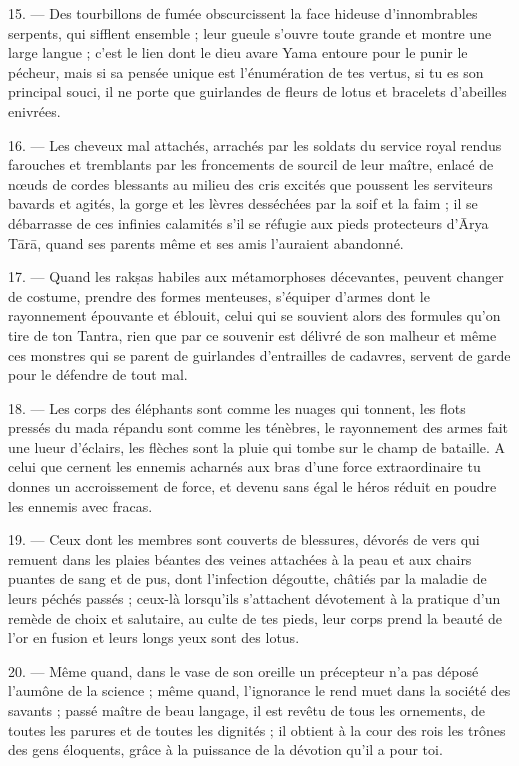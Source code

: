 \documentclass[a4paper, 11pt, oneside, french, landscape, twocolumn]{article}
\begin{document}
15. --- Des tourbillons de fumée obscurcissent la face hideuse d'innombrables serpents, qui sifflent ensemble ; leur gueule s'ouvre toute grande et montre une large langue ; c'est le lien dont le dieu avare Yama entoure pour le punir le pécheur, mais si sa pensée unique est l'énumération de tes vertus, si tu es son principal souci, il ne porte que guirlandes de fleurs de lotus et bracelets d'abeilles enivrées.

16. --- Les cheveux mal attachés, arrachés par les soldats du service royal rendus farouches et tremblants par les froncements de sourcil de leur maître, enlacé de nœuds de cordes blessants au milieu des cris excités que poussent les serviteurs bavards et agités, la gorge et les lèvres desséchées par la soif et la faim ; il se débarrasse de ces infinies calamités s'il se réfugie aux pieds protecteurs d'\={A}rya T\={a}r\={a}, quand ses parents même et ses amis l'auraient abandonné.

17. --- Quand les rak\d{s}as habiles aux métamorphoses décevantes, peuvent changer de costume, prendre des formes menteuses, s'équiper d'armes dont le rayonnement épouvante et éblouit, celui qui se souvient alors des formules qu'on tire de ton Tantra, rien que par ce souvenir est délivré de son malheur et même ces monstres qui se parent de guirlandes d'entrailles de cadavres, servent de garde pour le défendre de tout mal.

18. --- Les corps des éléphants sont comme les nuages qui tonnent, les flots pressés du mada répandu sont comme les ténèbres, le rayonnement des armes fait une lueur d'éclairs, les flèches sont la pluie qui tombe sur le champ de bataille. A celui que cernent les ennemis acharnés aux bras d'une force extraordinaire tu donnes un accroissement de force, et devenu sans égal le héros réduit en poudre les ennemis avec fracas.

19. --- Ceux dont les membres sont couverts de blessures, dévorés de vers qui remuent dans les plaies béantes des veines attachées à la peau et aux chairs puantes de sang et de pus, dont l'infection dégoutte, châtiés par la maladie de leurs péchés passés ; ceux-là lorsqu'ils s'attachent dévotement à la pratique d'un remède de choix et salutaire, au culte de tes pieds, leur corps prend la beauté de l'or en fusion et leurs longs yeux sont des lotus.

20. --- Même quand, dans le vase de son oreille un précepteur n'a pas déposé l'aumône de la science ; même quand, l'ignorance le rend muet dans la société des savants ; passé maître de beau langage, il est revêtu de tous les ornements, de toutes les parures et de toutes les dignités ; il obtient à la cour des rois les trônes des gens éloquents, grâce à la puissance de la dévotion qu'il a pour toi.
\end{document}
